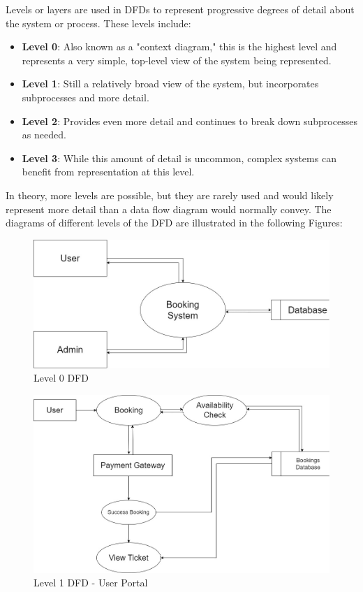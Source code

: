 \documentclass[12pt,a4paper]{report}
\begin{document}
Levels or layers are used in DFDs to represent progressive degrees of detail about the system or process. These levels include:
\begin{itemize}
    \item \textbf{Level 0}: Also known as a "context diagram," this is the highest level and represents a very simple, top-level view of the system being represented.
    \item \textbf{Level 1}: Still a relatively broad view of the system, but incorporates subprocesses and more detail.
    \item \textbf{Level 2}: Provides even more detail and continues to break down subprocesses as needed.
    \item \textbf{Level 3}: While this amount of detail is uncommon, complex systems can benefit from representation at this level.
\end{itemize}

In theory, more levels are possible, but they are rarely used and would likely represent more detail than a data flow diagram would normally convey. The diagrams of different levels of the DFD are illustrated in the following Figures:

\begin{figure}[h]
    \centering
    \includegraphics[width=\textwidth]{assets/DFD-1.jpg}
    \caption{Level 0 DFD}
    \label{dfd-1}
\end{figure}

\begin{figure}
    \centering
    \includegraphics[width=\textwidth]{assets/DFD-2-User.jpg}
    \caption{Level 1 DFD - User Portal}
    \label{dfd-2-user}
\end{figure}
\end{document}
